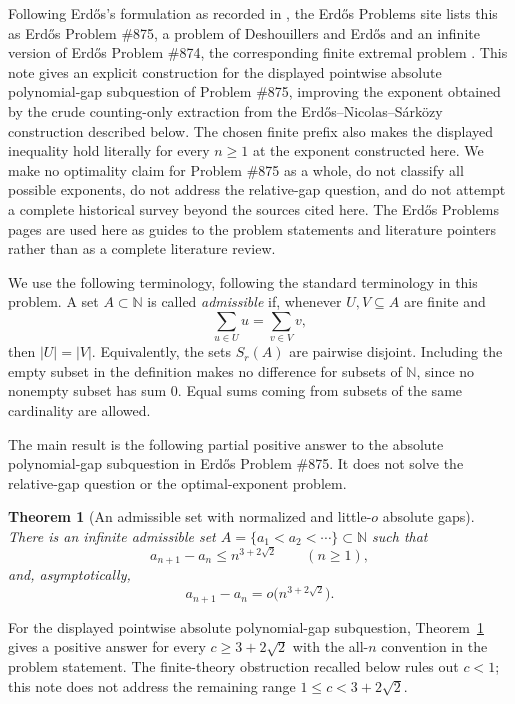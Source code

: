 \documentclass[11pt]{article}
\newtheorem{theorem}{Theorem}
\newcommand{\N}{\mathbb{N}}
\begin{document}
Following Erd\H{o}s's formulation as recorded in \cite{Erdos1998}, the Erd\H{o}s Problems site lists this as Erd\H{o}s Problem \#875, a problem of Deshouillers and Erd\H{o}s and an infinite version of Erd\H{o}s Problem \#874, the corresponding finite extremal problem \cite{Bloom874,Bloom875}.  This note gives an explicit construction for the displayed pointwise absolute polynomial-gap subquestion of Problem \#875, improving the exponent obtained by the crude counting-only extraction from the Erd\H{o}s--Nicolas--S\'ark\"ozy construction described below.  The chosen finite prefix also makes the displayed inequality hold literally for every $n\ge1$ at the exponent constructed here.  We make no optimality claim for Problem \#875 as a whole, do not classify all possible exponents, do not address the relative-gap question, and do not attempt a complete historical survey beyond the sources cited here.  The Erd\H{o}s Problems pages are used here as guides to the problem statements and literature pointers rather than as a complete literature review.

We use the following terminology, following the standard terminology in this problem.  A set $A\subset\N$ is called \emph{admissible} if, whenever $U,V\subseteq A$ are finite and
\[
        \sum_{u\in U}u=\sum_{v\in V}v,
\]
then $|U|=|V|$.  Equivalently, the sets $S_r(A)$ are pairwise disjoint.  Including the empty subset in the definition makes no difference for subsets of $\N$, since no nonempty subset has sum $0$.  Equal sums coming from subsets of the same cardinality are allowed.

The main result is the following partial positive answer to the absolute polynomial-gap subquestion in Erd\H{o}s Problem \#875.  It does not solve the relative-gap question or the optimal-exponent problem.

\begin{theorem}[An admissible set with normalized and little-$o$ absolute gaps]\label{thm:main}
There is an infinite admissible set $A=\{a_1<a_2<\cdots\}\subset\N$ such that
\[
        a_{n+1}-a_n\le n^{3+2\sqrt2}\qquad(n\ge1),
\]
and, asymptotically,
\[
        a_{n+1}-a_n=o\bigl(n^{3+2\sqrt2}\bigr).
\]
\end{theorem}

For the displayed pointwise absolute polynomial-gap subquestion, Theorem~\ref{thm:main} gives a positive answer for every $c\ge 3+2\sqrt2$ with the all-$n$ convention in the problem statement.  The finite-theory obstruction recalled below rules out $c<1$; this note does not address the remaining range $1\le c<3+2\sqrt2$.
\end{document}
